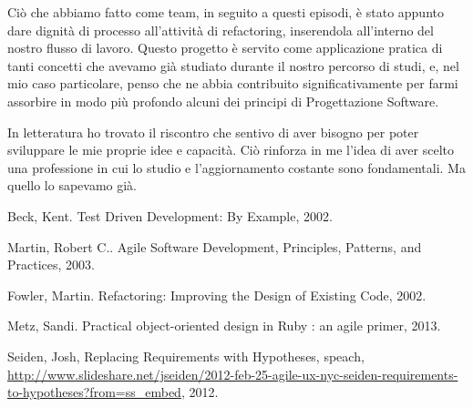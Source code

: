 \documentclass[12pt]{report}
\begin{document}
Ciò che abbiamo fatto come team, in seguito a questi episodi, è stato appunto
dare dignità di processo all'attività di refactoring, inserendola all'interno
del nostro flusso di lavoro. Questo progetto è servito come applicazione 
pratica di tanti concetti che avevamo già studiato durante il nostro percorso
di studi, e, nel mio caso particolare, penso che ne abbia contribuito 
significativamente per farmi assorbire in modo più profondo alcuni dei
principi di Progettazione Software.

In letteratura ho trovato il riscontro che sentivo di aver bisogno per
poter sviluppare le mie proprie idee e capacità. Ciò rinforza in me l'idea
di aver scelto una professione in cui lo studio e l'aggiornamento costante 
sono fondamentali. Ma quello lo sapevamo già.
%


%
%
\begin{thebibliography}{00}
%
Beck, Kent. Test Driven Development: By Example, 2002.

Martin, Robert C.. Agile Software Development, Principles, Patterns, and Practices, 2003.

Fowler, Martin. Refactoring: Improving the Design of Existing Code, 2002.

Metz, Sandi. Practical object-oriented design in Ruby : an agile primer, 2013.

Seiden, Josh, Replacing Requirements with Hypotheses, speach, \url{http://www.slideshare.net/jseiden/2012-feb-25-agile-ux-nyc-seiden-requirements-to-hypotheses?from=ss_embed}, 2012.

\end{thebibliography}
% 
\end{document}
